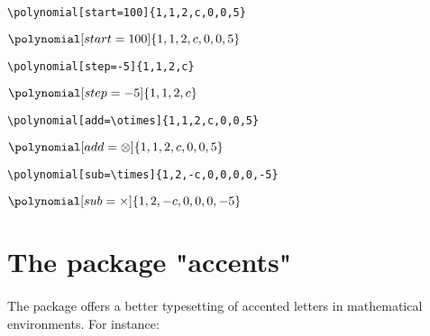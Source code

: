 \begin{center}
\begin{minipage}[l]{.59\textwidth}
\begin{verbatim}
\polynomial[start=100]{1,1,2,c,0,0,5}
\end{verbatim}
\end{minipage}
\begin{minipage}[r]{.39\textwidth}
$\polynomial[start=100]{1,1,2,c,0,0,5}$
\end{minipage}\vspace{.5cm}

\begin{minipage}[l]{.59\textwidth}
\begin{verbatim}
\polynomial[step=-5]{1,1,2,c}
\end{verbatim}
\end{minipage}
\begin{minipage}[r]{.39\textwidth}
\qquad $\polynomial[step=-5]{1,1,2,c}$
\end{minipage}\vspace{.5cm}

\begin{minipage}[l]{.59\textwidth}
\begin{verbatim}\polynomial[add=\otimes]{1,1,2,c,0,0,5}
\end{verbatim}
\end{minipage}
\begin{minipage}[r]{.39\textwidth}
\qquad $\polynomial[add=\otimes]{1,1,2,c,0,0,5}$
\end{minipage}\vspace{.5cm}

\begin{minipage}[l]{.59\textwidth}
\begin{verbatim}\polynomial[sub=\times]{1,2,-c,0,0,0,0,-5}
\end{verbatim}
\end{minipage}
\begin{minipage}[r]{.39\textwidth}
\qquad\quad $\polynomial[sub=\times]{1,2,-c,0,0,0,-5}$
\end{minipage}
\end{center}





\section{The package "accents"}
\paragraph*{}
The package  offers a better typesetting of accented letters in mathematical environments. For instance:

